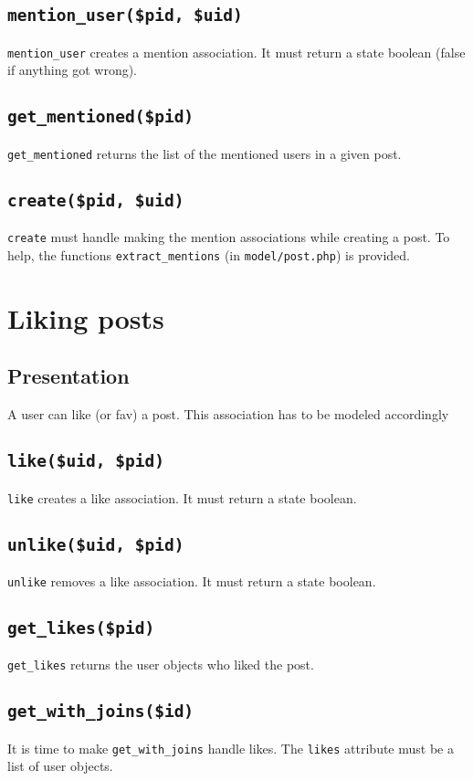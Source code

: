 \documentclass[twoside,a4paper,12pt]{article}
\begin{document}
\subsection{\texttt{mention\_user(\$pid, \$uid)}}
\texttt{mention\_user} creates a mention association. It must return a state boolean (false if anything got wrong).

\subsection{\texttt{get\_mentioned(\$pid)}}
\texttt{get\_mentioned} returns the list of the mentioned users in a given post.

\subsection{\texttt{create(\$pid, \$uid)}}
\texttt{create} must handle making the mention associations while creating a post. To help, the functions \texttt{extract\_mentions} (in \texttt{model/post.php}) is provided.

\section{Liking posts}

\subsection{Presentation}
A user can like (or fav) a post. This association has to be modeled accordingly

\subsection{\texttt{like(\$uid, \$pid)}}
\texttt{like} creates a like association. It must return a state boolean.

\subsection{\texttt{unlike(\$uid, \$pid)}}
\texttt{unlike} removes a like association. It must return a state boolean.

\subsection{\texttt{get\_likes(\$pid)}}
\texttt{get\_likes} returns the user objects who liked the post.

\subsection{\texttt{get\_with\_joins(\$id)}}
It is time to make \texttt{get\_with\_joins} handle likes. The \texttt{likes} attribute must be a list of user objects.
\end{document}
